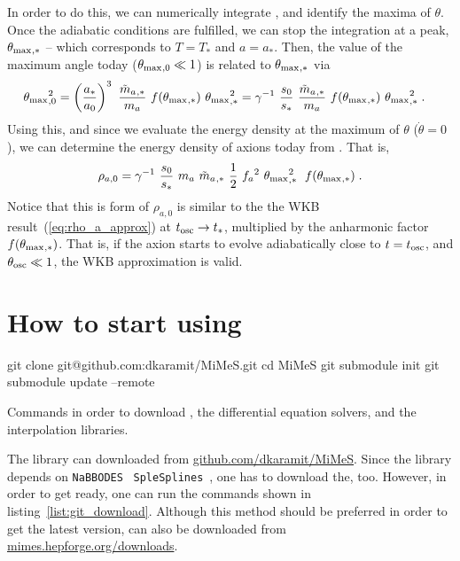 \documentclass[11pt,a4paper]{article}
\begin{document}
In order to do this, we can numerically integrate , and identify the maxima of $\theta$. Once the adiabatic conditions are fulfilled, we can stop the integration at a peak, $\theta_{\rm max}{}_{,*}$ -- which corresponds to $T=T_{*}$ and $a=a_{*}$. Then, the value of the maximum angle today ($\theta_{\rm max}{}_{,0} \ll 1$) is related to $\theta_{\rm max}{}_{,*}$ via
%
\begin{eqnarray}
	\thetamax_{,0}^2 &=  \lrb{\dfrac{a_*}{a_0}}^3 \ \dfrac{\maT_{,*}}{\ma} \ f(\thetamax_{,*}) \ \thetamax_{,*}^2  =
	\gamma^{-1} \ \dfrac{s_0}{s_*} \ \dfrac{\maT_{,*}}{\ma} \ f(\thetamax_{,*}) \ \thetamax_{,*}^2 
	\; .
	\label{eq:theta_relation}
\end{eqnarray}
%
Using this, and since we evaluate the energy density at the maximum of $\theta$ (\ie $\dot \theta = 0$), we can determine the energy density of axions today from . That is,
%
\begin{equation}
	\rho_{a,0} = \gamma^{-1} \ \dfrac{s_0}{s_*} \ \ma \ \maT_{,*} \ \dfrac{1}{2} \ \fa^2 \ \thetamax_{,*}^2 \;  \ f(\thetamax_{,*}) \;.
	\label{eq:rho_axion_exact}
\end{equation}
%
Notice that this is form of $\rho_{a,0}$  is similar to the the WKB result~(\ref{eq:rho_a_approx}) at $t_{\rm osc}{} \to t_*$, multiplied by the anharmonic factor $f(\theta_{\rm max}{}_{,*})$. That is, if the axion starts to evolve adiabatically close to $t=t_{\rm osc}{}$, and $\theta_{\rm osc}{} \ll 1$, the WKB approximation is valid.






\section{How to start using \mimes}\label{sec:start}
\setcounter{equation}{0}
%
\begin{listing}
	\begin{bash}
		git clone git@github.com:dkaramit/MiMeS.git
		cd MiMeS
		git submodule init
		git submodule update --remote
	\end{bash}
	\caption{Commands in order to download \mimes, the differential equation solvers, and the interpolation libraries.}
	\label{list:git_download}
\end{listing}
%
The library can downloaded from \href{https:/github.com/dkaramit/MiMeS}{github.com/dkaramit/MiMeS}. Since the library depends on {\tt NaBBODES}~\cite{NaBBODES} {\tt SpleSplines}~\cite{SimpleSplines}, one has to download the, too. However, in order to get \mimes ready, one can run the commands shown in listing~\ref{list:git_download}. Although this method should be preferred in order to get the latest version, \mimes can also be downloaded from \href{https:/mimes.hepforge.org/downloads/}{mimes.hepforge.org/downloads}.
\end{document}

